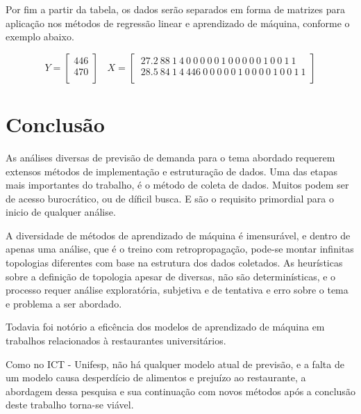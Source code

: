 \documentclass[	12pt, Times, openright, twoside, a4paper, english, brazil]{abntex2}
\begin{document}
	Por fim a partir da tabela, os dados serão separados em forma de matrizes para aplicação nos métodos de regressão linear e aprendizado de máquina, conforme o exemplo abaixo.
	
	$$Y=\left[\begin{array}{c}
	446\\
	470\\
	\end{array}\right]~~
	~~X=\left[\begin{array}{ccccccccccccc}
	~27.2 ~88 ~1 ~4 ~0 	 ~0 ~0 ~0 ~0 ~1 ~0 ~0 ~0 ~0 ~0 ~1 ~0 ~0 ~1 ~1\\
	~28.5 ~84 ~1 ~4 ~446 ~0 ~0 ~0 ~0 ~0 ~1 ~0 ~0 ~0 ~0 ~1 ~0 ~0 ~1 ~1\\
	\end{array}\right]$$

  \chapter{Conclusão}
    As análises diversas de previsão de demanda para o tema abordado requerem extensos métodos de implementação e estruturação de dados.
    Uma das etapas mais importantes do trabalho, é o método de coleta de dados. Muitos podem ser de acesso burocrático, ou de díficil busca. E são o requisito primordial para o inicio de qualquer análise.
    
    A diversidade de métodos de aprendizado de máquina é imensurável, e dentro de apenas uma análise, que é o treino com retropropagação, pode-se montar infinitas topologias diferentes com base na estrutura dos dados coletados. 
    As heurísticas sobre a definição de topologia apesar de diversas, não são determinísticas, e o processo requer análise exploratória, subjetiva e de tentativa e erro sobre o tema e problema a ser abordado.
    
    Todavia foi notório a eficência dos modelos de aprendizado de máquina em trabalhos relacionados à restaurantes universitários. 
    
    Como no ICT - Unifesp, não há qualquer modelo atual de previsão, e a falta de um modelo causa desperdício de alimentos e prejuízo ao restaurante, a abordagem dessa pesquisa e sua continuação com novos métodos após a conclusão deste trabalho torna-se viável.
\end{document}
